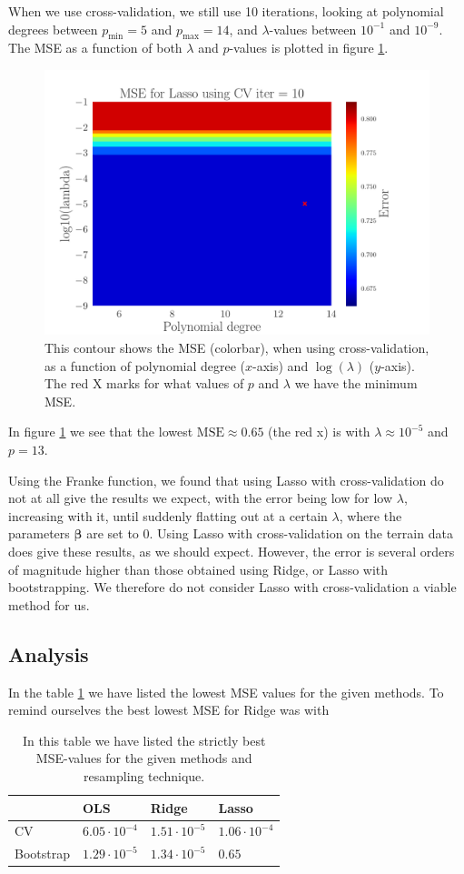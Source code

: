 \documentclass[reprint,english,notitlepage,aps,nobalancelastpage,nofootinbib]{revtex4-1}  %
\begin{document}
When we use cross-validation, we still use 10 iterations, looking at polynomial degrees between $p_\text{min} = 5$ and $p_\text{max} = 14$, and $\lambda$-values between $10^{-1}$ and $10^{-9}$. The MSE as a function of both $\lambda$ and $p$-values is plotted in figure \ref{fig:terrain_Lasso_MSE_CV}.
\begin{figure}[h]
	\includegraphics[width=0.8\linewidth]{SRTM_Contour_PL_Lasso_CV10_n50_eps0.2_p5_14_lmbm1_m9.pdf}
	\caption{This contour shows the MSE (colorbar), when using cross-validation, as a function of polynomial degree ($x$-axis) and $\log(\lambda)$ ($y$-axis). The red X marks for what values of $p$ and $\lambda$ we have the minimum MSE.}
	\label{fig:terrain_Lasso_MSE_CV}
\end{figure}
In figure \ref{fig:terrain_Lasso_MSE_CV} we see that the lowest $\text{MSE} \approx 0.65$ (the red x) is with $\lambda \approx 10^{-5}$ and $p = 13$.

Using the Franke function, we found that using Lasso with cross-validation do not at all give the results we expect, with the error being low for low $\lambda$, increasing with it, until suddenly flatting out at a certain $\lambda$, where the parameters $\boldsymbol{\beta}$ are set to 0. Using Lasso with cross-validation on the terrain data does give these results, as we should expect. However, the error is several orders of magnitude higher than those obtained using Ridge, or Lasso with bootstrapping. We therefore do not consider Lasso with cross-validation a viable method for us.

\subsection*{Analysis}
In the table \ref{tab:anal6} we have listed the lowest MSE values for the given methods. To remind ourselves the best lowest MSE for Ridge was with
\begin{table}[h]
	\begin{tabular}{|l|l|l|l|}
		\hline
		& OLS     & Ridge   & Lasso   \\ \hline
		CV        & $6.05\cdot10^{-4}$ & $1.51\cdot10^{-5}$ & $1.06\cdot10^{-4}$ \\ \hline
		Bootstrap & $1.29\cdot10^{-5}$ & $1.34\cdot10^{-5}$ & $0.65$    \\ \hline
	\end{tabular}\caption{In this table we have listed the strictly best MSE-values for the given methods and resampling technique.
	\label{tab:anal6}}
\end{table}
\end{document}
